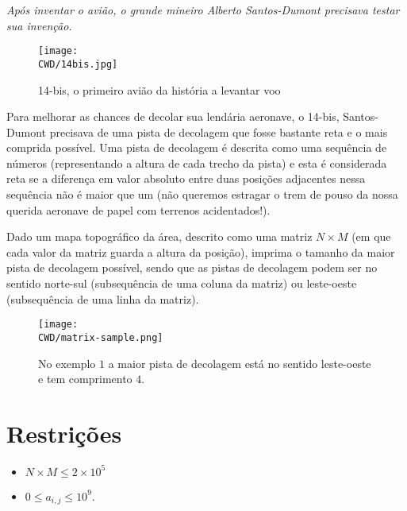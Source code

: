 %

\begin{center}
\textit{Após inventar o avião, o grande mineiro Alberto Santos-Dumont precisava testar sua invenção.}
\end{center}

\begin{figure}[H]
  \centering
  \texttt{[image: \\CWD/14bis.jpg]}
  \caption{14-bis, o primeiro avião da história a levantar voo}
\end{figure}

Para melhorar as chances de decolar sua lendária aeronave, o 14-bis, Santos-Dumont precisava de uma pista de decolagem que fosse bastante reta e o mais comprida possível. Uma pista de decolagem é descrita como uma sequência de números (representando a altura de cada trecho da pista) e esta é considerada reta se a diferença em valor absoluto entre duas posições adjacentes nessa sequência não é maior que um (não queremos estragar o trem de pouso da nossa querida aeronave de papel com terrenos acidentados!).

Dado um mapa topográfico da área, descrito como uma matriz $N\times M$ (em que cada valor da matriz guarda a altura da posição), imprima o tamanho da maior pista de decolagem possível, sendo que as pistas de decolagem podem ser no sentido norte-sul (subsequência de uma coluna da matriz) ou leste-oeste (subsequência de uma linha da matriz).

\begin{figure}[H]
  \centering
  \texttt{[image: \\CWD/matrix-sample.png]}
  \caption{No exemplo $1$ a maior pista de decolagem está no sentido leste-oeste e tem comprimento $4$.}
\end{figure}
%
%

%
%


\section*{Restrições}

\begin{itemize}
  \item $N \times M \leq 2\times 10^5$
  \item $0 \leq a_{i, j} \leq 10^9$.
\end{itemize}


\sampleio
